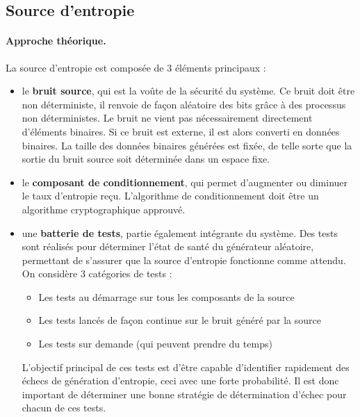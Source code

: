 \subsection{Source d'entropie}
\paragraph{Approche théorique.\\}
La source d'entropie est composée de 3 éléments principaux : 
\begin{itemize}
\item le \textbf{bruit source}, qui est la voûte de la sécurité du système. Ce bruit doit être non déterministe, il renvoie de façon aléatoire des bits grâce à des processus non déterministes. Le bruit ne vient pas nécessairement directement d'éléments binaires. Si ce bruit est externe, il est alors converti en données binaires. La taille des données binaires générées est fixée, de telle sorte que la sortie du bruit source soit déterminée dans un espace fixe.
\item le \textbf{composant de conditionnement}, qui permet d'augmenter ou diminuer le taux d'entropie reçu. L'algorithme de conditionnement doit être un algorithme cryptographique approuvé.
\item une \textbf{batterie de tests}, partie également intégrante du système. Des tests sont réalisés pour déterminer l'état de santé du générateur aléatoire, permettant de s'assurer que la source d'entropie fonctionne comme attendu. On considère 3 catégories de tests : 
	\begin{itemize}
	\item Les tests au démarrage sur tous les composants de la source
	\item Les tests lancés de façon continue sur le bruit généré par la source
	\item Les tests sur demande (qui peuvent prendre du temps)
	\end{itemize}
	L'objectif principal de ces tests est d'être capable d'identifier rapidement des échecs de génération d'entropie, ceci avec une forte probabilité. Il est donc important de déterminer une bonne stratégie de détermination d'échec pour chacun de ces tests.\\
\end{itemize}

